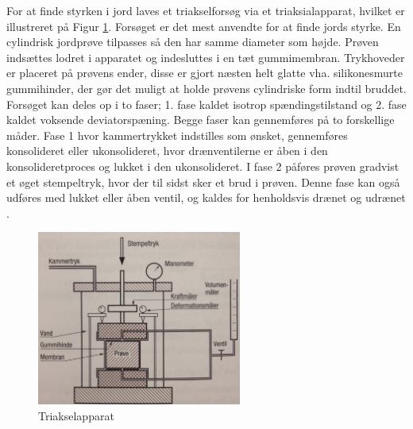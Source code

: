 For at finde styrken i jord laves et triakselforsøg via et triaksialapparat, hvilket er illustreret på Figur \ref{fig:forskudningsspanding}. Forsøget er det mest anvendte for at finde jords styrke. En cylindrisk jordprøve tilpasses så den har samme diameter som højde. Prøven indsættes lodret i apparatet og indesluttes i en tæt gummimembran. Trykhoveder er placeret på prøvens ender, disse er gjort næsten helt glatte vha. silikonesmurte gummihinder, der gør det muligt at holde prøvens cylindriske form indtil bruddet.  
\newline \indent{     } Forsøget kan deles op i to faser; 1. fase kaldet isotrop spændingstilstand og 2. fase kaldet voksende deviatorspæning. Begge faser kan gennemføres på to forskellige måder. Fase 1 hvor kammertrykket indstilles som ønsket, gennemføres konsolideret eller ukonsolideret, hvor drænventilerne er åben i den konsolideretproces og lukket i den ukonsolideret. I fase 2 påføres prøven gradvist et øget stempeltryk, hvor der til sidst sker et brud i prøven. Denne fase kan også udføres med lukket eller åben ventil, og kaldes for henholdsvis drænet og udrænet \citep{geoteknik}.

\begin{figure}[htbp]
	\centering
	\includegraphics[width=0.6\textwidth]{billeder/forskud.png}
	\caption{Triakselapparat \citep{geoteknik}}
	\label{fig:forskudningsspanding}
\end{figure}

